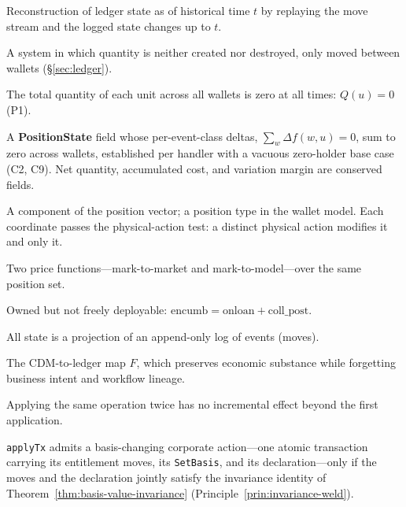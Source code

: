 \documentclass[11pt,a4paper]{article}
\begin{document}
\begin{description}[style=nextline]
\item[Clone\_at($t$)] Reconstruction of ledger state as of historical time $t$ by replaying the move stream and the logged state changes up to $t$.

\item[Closed system] A system in which quantity is neither created nor destroyed, only moved between wallets (\S\ref{sec:ledger}).

\item[Conservation law] The total quantity of each unit across all wallets is zero at all times: $Q(u)=0$ (P1).

\item[Conserved field] A \textbf{PositionState} field whose per-event-class deltas, $\sum_w\Delta f(w,u)=0$, sum to zero across wallets, established per handler with a vacuous zero-holder base case (C2, C9). Net quantity, accumulated cost, and variation margin are conserved fields.

\item[Coordinate] A component of the position vector; a position type in the wallet model. Each coordinate passes the physical-action test: a distinct physical action modifies it and only it.

\item[Dual valuation] Two price functions---mark-to-market and mark-to-model---over the same position set.

\item[Encumbrance] Owned but not freely deployable: $\mathrm{encumb}=\mathrm{onloan}+\mathrm{coll\_post}$.

\item[Event sourcing] All state is a projection of an append-only log of events (moves).

\item[Forgetful mapping] The CDM-to-ledger map $F$, which preserves economic substance while forgetting business intent and workflow lineage.

\item[Idempotency] Applying the same operation twice has no incremental effect beyond the first application.

\item[Invariance weld] \texttt{applyTx} admits a basis-changing corporate action---one atomic transaction carrying its entitlement moves, its \texttt{SetBasis}, and its declaration---only if the moves and the declaration jointly satisfy the invariance identity of Theorem~\ref{thm:basis-value-invariance} (Principle~\ref{prin:invariance-weld}).


\end{description}
\end{document}
